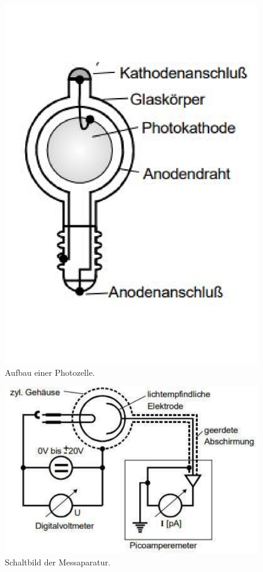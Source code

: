 \begin{figure}
    \centering
    \includegraphics[width =\textwidth]{content/photozelle.pdf}
    \caption{Aufbau einer Photozelle.\cite{anleitung}}
    \label{fig:photozelle}
\end{figure}

\begin{figure}
    \centering
    \includegraphics[width =\textwidth]{content/schaltbild.pdf}
    \caption{Schaltbild der Messaparatur.\cite{anleitung}}
    \label{fig:schaltbild}
\end{figure}

